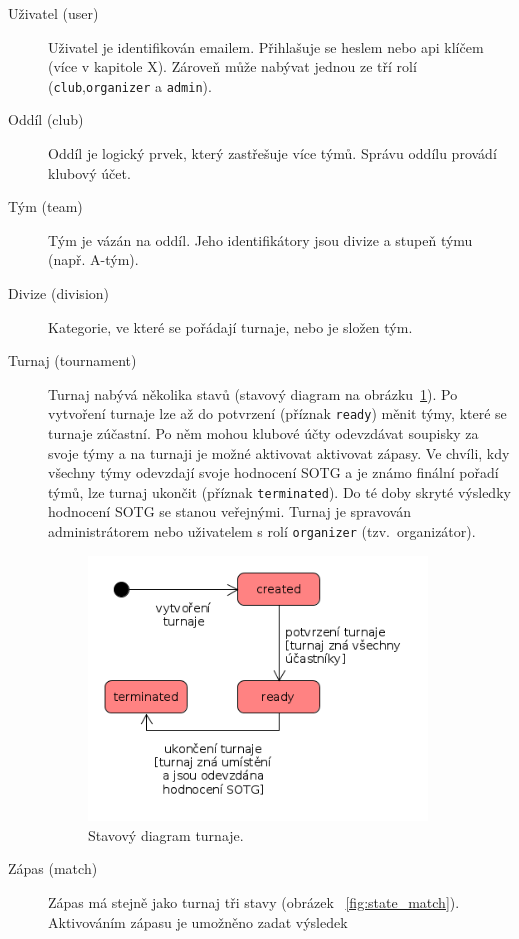 \begin{description}
  \item[Uživatel (user)]
  Uživatel je identifikován emailem. Přihlašuje se heslem nebo api klíčem (více v kapitole X).
  Zároveň může nabývat jednou ze tří rolí (\texttt{club},\texttt{organizer} a \texttt{admin}).
  \item[Oddíl (club)]
  Oddíl je logický prvek, který zastřešuje více týmů. Správu oddílu provádí klubový účet.
  \item[Tým (team)]
  Tým je vázán na oddíl. Jeho identifikátory jsou divize a stupeň týmu (např. A-tým).
  \item[Divize (division)]
  Kategorie, ve které se pořádají turnaje, nebo je složen tým. %
  \item[Turnaj (tournament)]
    Turnaj nabývá několika stavů (stavový diagram na obrázku~\ref{fig:state_tournament}).
    Po vytvoření turnaje lze až do potvrzení (příznak \texttt{ready}) měnit týmy, které se turnaje zúčastní.
    Po něm mohou klubové účty odevzdávat soupisky za svoje týmy a na turnaji je možné aktivovat aktivovat zápasy. Ve chvíli,
    kdy všechny týmy odevzdají svoje hodnocení SOTG a je známo finální pořadí týmů,
    lze turnaj ukončit (příznak \texttt{terminated}). Do té doby skryté výsledky hodnocení SOTG se stanou veřejnými.
    Turnaj je spravován administrátorem nebo uživatelem s rolí \texttt{organizer} (tzv.~organizátor).
    \begin{figure}[ht!]
      \centering
      \includegraphics[width=90mm]{./images/stavovy-diagram-turnaj.png}
      \caption{Stavový diagram turnaje.\label{overflow}}
      \label{fig:state_tournament}
    \end{figure}
  \item[Zápas (match)]
    Zápas má stejně jako turnaj tři stavy (obrázek ~\ref{fig:state_match}). Aktivováním zápasu je umožněno zadat výsledek

\end{description}
